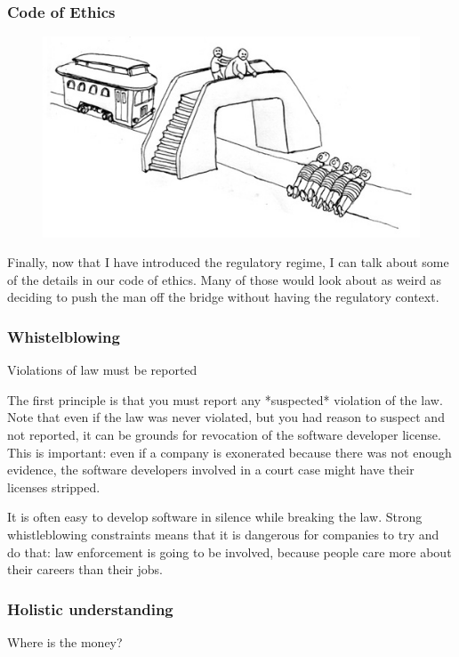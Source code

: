 \begin{frame}[fragile]
\frametitle{Code of Ethics}

\begin{figure}
\includegraphics{fat}
\end{figure}

\end{frame}

Finally,
now that I have introduced the regulatory regime,
I can talk about some of the details in our code of ethics.
Many of those would look about as weird as 
deciding to push the man off the bridge
without having the regulatory context.

\begin{frame}[fragile]
\frametitle{Whistelblowing}

Violations of law must be reported

\end{frame}

The first principle is that you must report any
*suspected*
violation of the law.
Note that even if the law was never violated,
but you had reason to suspect and not reported,
it can be grounds for revocation of the
software developer license.
This is important:
even if a company is exonerated because there was not enough evidence,
the software developers involved in a court case might have their
licenses stripped.

It is often easy to develop software in silence while breaking the law.
Strong whistleblowing constraints means that it is dangerous
for companies to try and do that:
law enforcement is going to be involved,
because people care more about their careers than their jobs.

\begin{frame}[fragile]
\frametitle{Holistic understanding}

Where is the money?
\end{frame}

